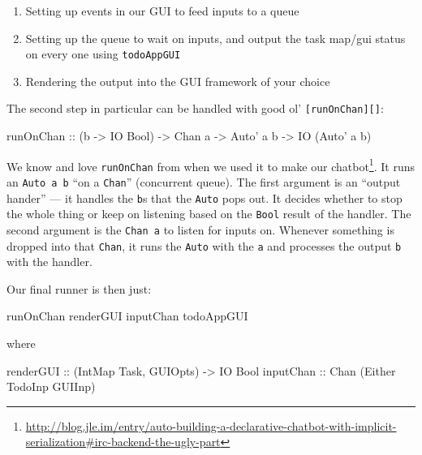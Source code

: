 \documentclass[]{article}
\newenvironment{Shaded}{}{}
\newcommand{\DataTypeTok}[1]{\textcolor[rgb]{0.56,0.13,0.00}{{#1}}}
\newcommand{\OtherTok}[1]{\textcolor[rgb]{0.00,0.44,0.13}{{#1}}}
\newcommand{\NormalTok}[1]{{#1}}
\renewcommand{\href}[2]{#2\footnote{\url{#1}}}
\begin{document}
\begin{enumerate}
\def\labelenumi{\arabic{enumi}.}
\tightlist
\item
  Setting up events in our GUI to feed inputs to a queue
\item
  Setting up the queue to wait on inputs, and output the task map/gui
  status on every one using \texttt{todoAppGUI}
\item
  Rendering the output into the GUI framework of your choice
\end{enumerate}

The second step in particular can be handled with good ol'
\texttt{{[}runOnChan{]}{[}{]}}:

\begin{Shaded}
\begin{Highlighting}[]
\OtherTok{runOnChan ::} \NormalTok{(b }\OtherTok{->} \DataTypeTok{IO} \DataTypeTok{Bool}\NormalTok{) }\OtherTok{->} \DataTypeTok{Chan} \NormalTok{a }\OtherTok{->} \DataTypeTok{Auto'} \NormalTok{a b }\OtherTok{->} \DataTypeTok{IO} \NormalTok{(}\DataTypeTok{Auto'} \NormalTok{a b)}
\end{Highlighting}
\end{Shaded}

We know and love \texttt{runOnChan} from when we used it to make our
\href{http://blog.jle.im/entry/auto-building-a-declarative-chatbot-with-implicit-serialization\#irc-backend-the-ugly-part}{chatbot}.
It runs an \texttt{Auto\textquotesingle{}\ a\ b} ``on a \texttt{Chan}''
(concurrent queue). The first argument is an ``output hander'' --- it
handles the \texttt{b}s that the \texttt{Auto\textquotesingle{}} pops
out. It decides whether to stop the whole thing or keep on listening
based on the \texttt{Bool} result of the handler. The second argument is
the \texttt{Chan\ a} to listen for inputs on. Whenever something is
dropped into that \texttt{Chan}, it runs the
\texttt{Auto\textquotesingle{}} with the \texttt{a} and processes the
output \texttt{b} with the handler.

Our final runner is then just:

\begin{Shaded}
\begin{Highlighting}[]
\NormalTok{runOnChan renderGUI inputChan todoAppGUI}
\end{Highlighting}
\end{Shaded}

where

\begin{Shaded}
\begin{Highlighting}[]
\OtherTok{renderGUI ::} \NormalTok{(}\DataTypeTok{IntMap} \DataTypeTok{Task}\NormalTok{, }\DataTypeTok{GUIOpts}\NormalTok{) }\OtherTok{->} \DataTypeTok{IO} \DataTypeTok{Bool}
\OtherTok{inputChan ::} \DataTypeTok{Chan} \NormalTok{(}\DataTypeTok{Either} \DataTypeTok{TodoInp} \DataTypeTok{GUIInp}\NormalTok{)}
\end{Highlighting}
\end{Shaded}
\end{document}
